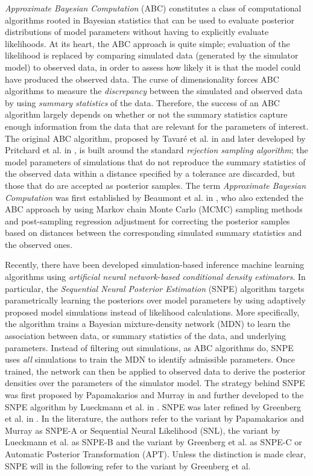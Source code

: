 \textit{Approximate Bayesian Computation} (ABC) constitutes a class of computational algorithms rooted in Bayesian statistics that can be used to evaluate posterior distributions of model parameters without having to explicitly evaluate likelihoods. At its heart, the ABC approach is quite simple; evaluation of the likelihood is replaced by comparing simulated data (generated by the simulator model) to observed data, in order to assess how likely it is that the model could have produced the observed data. The curse of dimensionality forces ABC algorithms to measure the \textit{discrepancy} between the simulated and observed data by using \textit{summary statistics} of the data. Therefore, the success of an ABC algorithm largely depends on whether or not the summary statistics capture enough information from the data that are relevant for the parameters of interest. The original ABC algorithm, proposed by Tavaré et al. in \cite{Tavare} and later developed by Pritchard et al. in \cite{Pritchard}, is built around the standard \textit{rejection sampling algorithm}; the model parameters of simulations that do not reproduce the summary statistics of the observed data within a distance specified by a tolerance are discarded, but those that do are accepted as posterior samples. The term \textit{Approximate Bayesian Computation} was first established by Beaumont et al. in \cite{Beaumont}, who also extended the ABC approach by using Markov chain Monte Carlo (MCMC) sampling methods and post-sampling regression adjustment for correcting the posterior samples based on distances between the corresponding simulated summary statistics and the observed ones.

Recently, there have been developed simulation-based inference machine learning algorithms using \textit{artificial neural network-based conditional density estimators}. In particular, the  \textit{Sequential Neural Posterior Estimation} (SNPE) algorithm targets parametrically learning the posteriors over model parameters by using adaptively proposed model simulations instead of likelihood calculations. More specifically, the algorithm trains a Bayesian mixture-density network (MDN) to learn the association between data, or summary statistics of the data, and underlying parameters. Instead of filtering out simulations, as ABC algorithms do, SNPE uses \textit{all} simulations to train the MDN to identify admissible parameters. Once trained, the network can then be applied to observed data to derive the posterior densities over the parameters of the simulator model. The strategy behind SNPE was first proposed by Papamakarios and Murray in \cite{SNL_first} and further developed to the SNPE algorithm by Lueckmann et al. in \cite{SNPE_first}. SNPE was later refined by Greenberg et al. in \cite{SNPE_apt}. In the literature, the authors refer to the variant by Papamakarios and Murray as SNPE-A or Sequential Neural Likelihood (SNL), the variant by Lueckmann et al. as SNPE-B and the variant by Greenberg et al. as SNPE-C or Automatic Posterior Transformation (APT). Unless the distinction is made clear, SNPE will in the following refer to the variant by Greenberg et al. 


